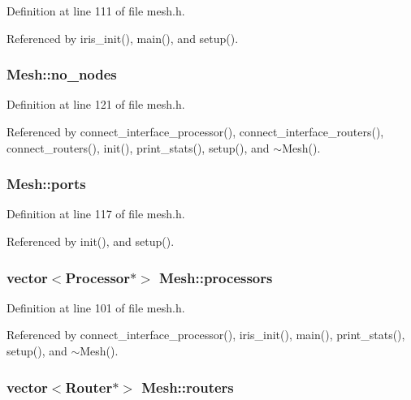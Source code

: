 Definition at line 111 of file mesh.h.

Referenced by iris\_\-init(), main(), and setup().
\subsubsection[{no\_\-nodes}]{ {\bf Mesh::no\_\-nodes}\hspace{0.3cm}{\tt  [private]}}\label{classMesh_df149d865bc81a734660461e97f9e9d8}




Definition at line 121 of file mesh.h.

Referenced by connect\_\-interface\_\-processor(), connect\_\-interface\_\-routers(), connect\_\-routers(), init(), print\_\-stats(), setup(), and $\sim$Mesh().
\subsubsection[{ports}]{ {\bf Mesh::ports}\hspace{0.3cm}{\tt  [private]}}\label{classMesh_147329c914fbfb0f6ce733a4e3120bc6}




Definition at line 117 of file mesh.h.

Referenced by init(), and setup().
\subsubsection[{processors}]{\setlength{\rightskip}{0pt plus 5cm}vector$<${\bf Processor}$\ast$$>$ {\bf Mesh::processors}}\label{classMesh_e3531860febe9e7194b5d44ac1c1b2d8}




Definition at line 101 of file mesh.h.

Referenced by connect\_\-interface\_\-processor(), iris\_\-init(), main(), print\_\-stats(), setup(), and $\sim$Mesh().
\subsubsection[{routers}]{\setlength{\rightskip}{0pt plus 5cm}vector$<${\bf Router}$\ast$$>$ {\bf Mesh::routers}}\label{classMesh_da66e4e75f4e50237af30d495248cca2}




